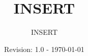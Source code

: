 \begin{titlepage} 						%
\title{INSERT}
\author{INSERT}
\date{Revision: 1.0 - \today}
\maketitle
\end{titlepage}							%